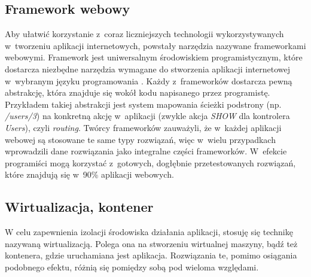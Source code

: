 \subsection{Framework webowy} %
Aby ułatwić korzystanie z~coraz liczniejszych technologii wykorzystywanych w~tworzeniu aplikacji internetowych, powstały narzędzia nazywane frameworkami webowymi. Framework jest uniwersalnym środowiskiem programistycznym, które dostarcza niezbędne narzędzia wymagane do stworzenia aplikacji internetowej w~wybranym języku programowania \cite{framework}. Każdy z~frameworków dostarcza pewną abstrakcję, która znajduje się wokół kodu napisanego przez programistę. Przykładem takiej abstrakcji jest system mapowania ścieżki podstrony (np. \textit{/users/3}) na konkretną akcję w~aplikacji (zwykle akcja \emph{SHOW} dla kontrolera \emph{Users}), czyli \emph{routing}. Twórcy frameworków zauważyli, że w~każdej aplikacji webowej są stosowane te same typy rozwiązań, więc w~wielu przypadkach wprowadzili dane rozwiązania jako integralne części frameworków. W~efekcie programiści mogą korzystać z~gotowych, dogłębnie przetestowanych rozwiązań, które znajdują się w~90\% aplikacji webowych.

\subsection{Wirtualizacja, kontener} %
W celu zapewnienia izolacji środowiska działania aplikacji, stosuję się technikę nazywaną wirtualizacją. Polega ona na stworzeniu wirtualnej maszyny, bądź też kontenera, gdzie uruchamiana jest aplikacja. Rozwiązania te, pomimo osiągania podobnego efektu, różnią się pomiędzy sobą pod wieloma względami.

